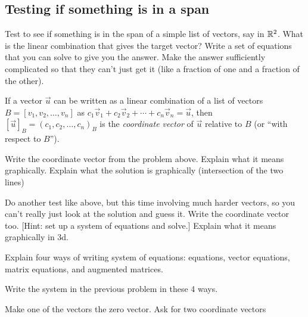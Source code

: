 \subsection{Testing if something is in a span}

\begin{problemtodo}
  Test to see if something is in the span of a simple list of vectors,
  say in $\mathbb{R}^2$.  What is the linear combination that gives the
  target vector?  Write a set of equations that you can solve to give
  you the answer.  Make the answer sufficiently complicated so that
  they can't just get it (like a fraction of one and a fraction of the
  other).
\end{problemtodo}

\begin{definition}
  If a vector $\vec u$ can be written as a linear combination of
  a list of vectors $B=[v_1,v_2,\ldots,v_n]$ as $c_1\vec v_1+c_2\vec v_2+\cdots+c_n\vec
  v_n=\vec u$, then $[\vec u]_B=(c_1,c_2,\ldots,c_n)_B$ is the \emph{coordinate
  vector} of $\vec u$ relative to $B$ (or ``with respect to
$B$'').
\end{definition}

\begin{problemtodo}
  Write the coordinate vector from the problem above.  Explain what it
  means graphically.  Explain what the solution is graphically
  (intersection of the two lines)
\end{problemtodo}

\begin{problemtodo}
  Do another test like above, but this time involving much harder
  vectors, so you can't really just look at the solution and guess it.
  Write the coordinate vector too.  [Hint: set up a system of
  equations and solve.]  Explain what it means graphically in 3d.
\end{problemtodo}

Explain four ways of writing system of equations: equations, vector
equations, matrix equations, and augmented matrices.

\begin{problemtodo}
  Write the system in the previous problem in these 4 ways.
\end{problemtodo}

\begin{problemtodo}
  Make one of the vectors the zero vector.  Ask for two coordinate vectors
\end{problemtodo}

